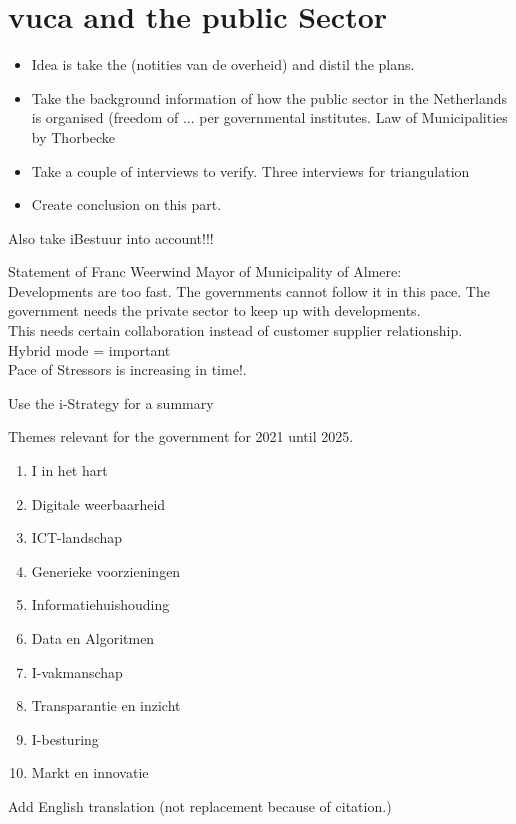 \chapter{\acrshort{vuca} and the public Sector}
\label{ch:vucaandpublicsector}

\begin{itemize}
\item{Idea is take the (notities van de overheid) and distil the plans.}
\item{Take the background information of how the public sector in the Netherlands is organised (freedom of ... per governmental institutes. Law of Municipalities by Thorbecke }
\item{Take a couple of interviews to verify. Three interviews for triangulation}
\item{Create conclusion on this part.}
\end{itemize}

\begin{remark}
	Also take iBestuur into account!!!
\end{remark}

Statement of Franc Weerwind Mayor of Municipality of Almere:\\
Developments are too fast. The governments cannot follow it in this pace. The government needs the private sector to keep up with developments.\\
This needs certain collaboration instead of customer supplier relationship.\\
Hybrid mode = important\\
Pace of Stressors is increasing in time!.\\

\begin{remark}
	Use the i-Strategy for a summary \parencite{Digitaleoverheid}
\end{remark}

Themes relevant for the government for 2021 until 2025.

\begin{enumerate}
	\item{I in het hart}
	\item{Digitale weerbaarheid}
	\item{ICT-landschap}
	\item{Generieke voorzieningen}
	\item{Informatiehuishouding}
	\item{Data en Algoritmen}
	\item{I-vakmanschap}
	\item{Transparantie en inzicht}
	\item{I-besturing}
	\item{Markt en innovatie}
\end{enumerate}

\begin{remark}
	Add English translation (not replacement because of citation.)
\end{remark}
